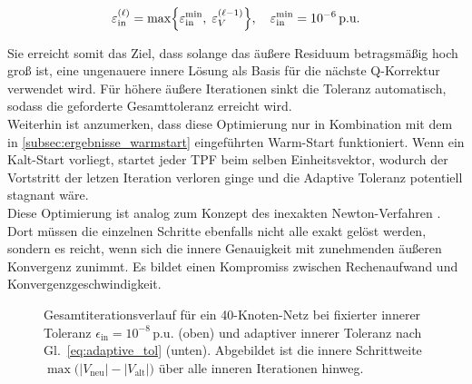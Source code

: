\begin{equation}
	\varepsilon_\mathrm{in}^{(\ell)}
	= \max\Bigl\{\varepsilon_\mathrm{in}^{\min},\;
	\varepsilon_V^{(\ell-1)}\Bigr\},\quad
	\varepsilon_\mathrm{in}^{\min}=10^{-6}\,\text{p.u.}
	\label{eq:adaptive_tol}
\end{equation}

Sie erreicht somit das Ziel, dass solange das äußere Residuum betragsmäßig hoch groß ist, eine ungenauere innere Lösung als Basis für die nächste Q-Korrektur verwendet wird.
Für höhere äußere Iterationen sinkt die Toleranz automatisch, sodass die geforderte Gesamttoleranz erreicht wird.\\

Weiterhin ist anzumerken, dass diese Optimierung nur in Kombination mit dem in \cref{subsec:ergebnisse_warmstart} eingeführten Warm-Start funktioniert.
Wenn ein Kalt-Start vorliegt, startet jeder TPF beim selben Einheitsvektor, wodurch der Vortstritt der letzen Iteration verloren ginge und die Adaptive Toleranz potentiell stagnant wäre.\\

Diese Optimierung ist analog zum Konzept des inexakten Newton-Verfahren \cite{Dembo1982}. 
Dort müssen die einzelnen Schritte ebenfalls nicht alle exakt gelöst werden, sondern es reicht, wenn sich die innere Genauigkeit mit zunehmenden äußeren Konvergenz zunimmt.
Es bildet einen Kompromiss zwischen Rechenaufwand und Konvergenzgeschwindigkeit.\\




\begin{figure}[htbp]
	\centering
	
	\caption{Gesamtiterationsverlauf für ein 40-Knoten-Netz bei fixierter
		innerer Toleranz $\epsilon_\mathrm{in}=10^{-8}\,\text{p.u.}$ (oben) und
		adaptiver innerer Toleranz nach Gl.~\eqref{eq:adaptive_tol} (unten).
		Abgebildet ist die innere Schrittweite
		$\max\bigl(|V_\mathrm{neu}|-|V_\mathrm{alt}|\bigr)$ über alle inneren
		Iterationen hinweg.}
	\label{fig:adaptive_inner_comparison}
\end{figure}

